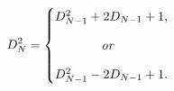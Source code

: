 \documentclass[class=scrreprt,preview,fontsize=14pt]{standalone}
\begin{document}
\begin{preview}
\begin{equation}
    \label{Eq:I:6:7}
    D_N^2=
    \begin{cases}
    D_{N-1}^2+2D_{N-1}+1,\\[2ex]
    \kern 3.7em \textit{or}\\[2ex]
    D_{N-1}^2-2D_{N-1}+1.
    \end{cases}
\end{equation}
\end{preview}
\end{document}

